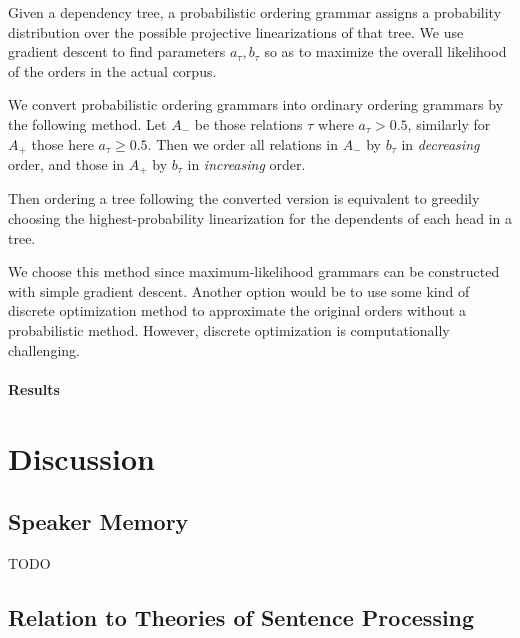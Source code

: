 \documentclass[11pt,letterpaper]{article}
\begin{document}
Given a dependency tree, a probabilistic ordering grammar assigns a probability distribution over the possible projective linearizations of that tree.
We use gradient descent to find parameters $a_\tau, b_\tau$ so as to maximize the overall likelihood of the orders in the actual corpus.


We convert probabilistic ordering grammars into ordinary ordering grammars by the following method.
Let $A_-$ be those relations $\tau$ where $a_\tau > 0.5$, similarly for $A_+$ those here $a_\tau \geq 0.5$.
Then we order all relations in $A_-$ by $b_\tau$ in \emph{decreasing} order, and those in $A_+$ by $b_\tau$ in \emph{increasing} order.

Then ordering a tree following the converted version is equivalent to greedily choosing the highest-probability linearization for the dependents of each head in a tree.


We choose this method since maximum-likelihood grammars can be constructed with simple gradient descent.
Another option would be to use some kind of discrete optimization method to approximate the original orders without a probabilistic method.
However, discrete optimization is computationally challenging.

\paragraph{Results}


\section{Discussion}

\subsection{Speaker Memory}

TODO

\subsection{Relation to Theories of Sentence Processing}
\end{document}
